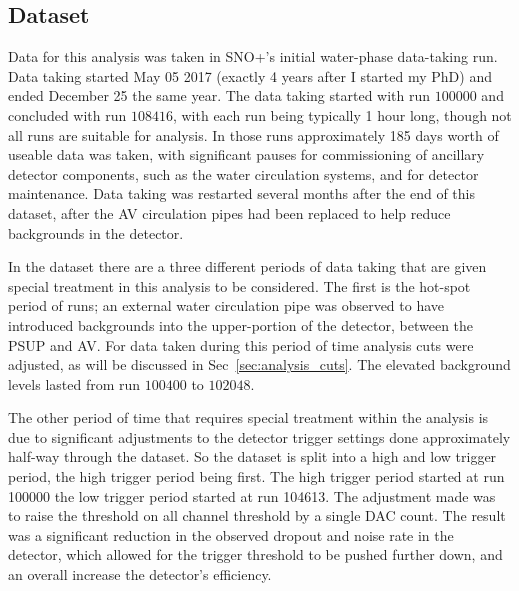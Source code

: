 \subsection{Dataset}
\label{sec:dataset}
Data for this analysis was taken in SNO+'s initial water-phase data-taking
run.
Data taking started May 05 2017 (exactly 4 years after I
started my PhD) and ended December 25 the same year.
The data taking started with run $100000$ and concluded with run
$108416$, with each run being typically 1 hour long, though not
all runs are suitable for analysis.
In those runs approximately 185 days worth of useable data was taken,
with significant pauses for commissioning of ancillary detector components,
such as the water circulation systems, and for detector maintenance.
Data taking was restarted several months after the end of this dataset,
after the AV circulation pipes had been replaced to help reduce backgrounds
in the detector.

In the dataset there are a three different periods of data taking that are
given special treatment in this analysis
to be considered.
The first is the hot-spot period of runs;
an external water circulation pipe was observed to have
introduced backgrounds into the upper-portion of the detector, between the
PSUP and AV\@.
For data taken during this period of time analysis cuts were adjusted, as
will be discussed in Sec~\ref{sec:analysis_cuts}.
The elevated background levels lasted from run $100400$ to $102048$.

The other period of time that requires special treatment within the analysis
is due to significant adjustments to the detector trigger settings done approximately
half-way through the dataset.
So the dataset is split into a high and low trigger period, the high trigger
period being first.
The high trigger period started at run 100000 the low trigger period started
at run 104613.
The adjustment made was to raise the threshold on all channel threshold
by a single DAC count.
The result was a significant reduction in the observed dropout and noise rate
in the detector, which allowed for the trigger threshold to be pushed further
down, and an overall increase the detector's efficiency.


